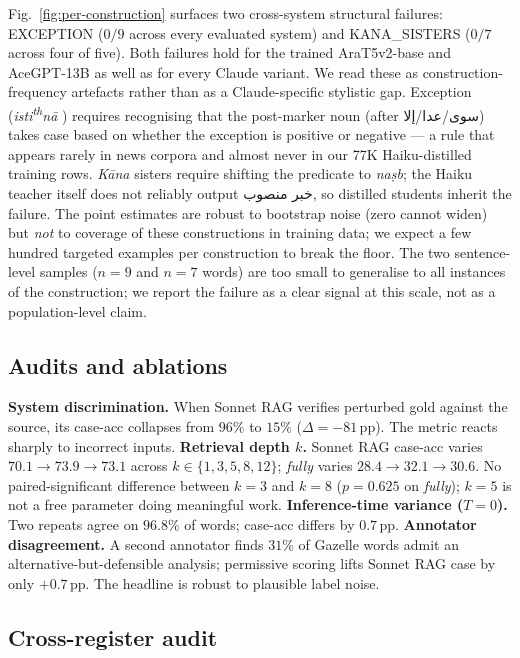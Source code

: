 \documentclass[10pt,a4paper,twocolumn]{article}
\providecommand{\textarabic}[1]{{\arabicfont #1}}
\begin{document}
Fig.~\ref{fig:per-construction} surfaces two cross-system structural failures: EXCEPTION ($0/9$ across every evaluated system) and KANA\_SISTERS ($0/7$ across four of five). Both failures hold for the trained AraT5v2-base and AceGPT-13B as well as for every Claude variant. We read these as construction-frequency artefacts rather than as a Claude-specific stylistic gap. Exception (\emph{isti\textsuperscript{th}n\=a$\,$\textsuperscript{}$\,$}) requires recognising that the post-marker noun (after \textarabic{سوى}/\textarabic{عدا}/\textarabic{إلا}) takes case based on whether the exception is positive or negative --- a rule that appears rarely in news corpora and almost never in our 77K Haiku-distilled training rows. \emph{K\=ana} sisters require shifting the predicate to \emph{na\d{s}b}; the Haiku teacher itself does not reliably output \textarabic{خبر منصوب}, so distilled students inherit the failure. The point estimates are robust to bootstrap noise (zero cannot widen) but \emph{not} to coverage of these constructions in training data; we expect a few hundred targeted examples per construction to break the floor. The two sentence-level samples ($n{=}9$ and $n{=}7$ words) are too small to generalise to all instances of the construction; we report the failure as a clear signal at this scale, not as a population-level claim.

\subsection{Audits and ablations}
\label{sec:audit}

\textbf{System discrimination.} When Sonnet RAG verifies perturbed gold against the source, its case-acc collapses from $96\%$ to $15\%$ ($\Delta = -81$\,pp). The metric reacts sharply to incorrect inputs.
\textbf{Retrieval depth $k$.} Sonnet RAG case-acc varies $70.1 \to 73.9 \to 73.1$ across $k \in \{1, 3, 5, 8, 12\}$; \emph{fully} varies $28.4 \to 32.1 \to 30.6$. No paired-significant difference between $k{=}3$ and $k{=}8$ ($p{=}0.625$ on \emph{fully}); $k{=}5$ is not a free parameter doing meaningful work.
\textbf{Inference-time variance ($T{=}0$).} Two repeats agree on $96.8\%$ of words; case-acc differs by $0.7$\,pp.
\textbf{Annotator disagreement.} A second annotator finds $31\%$ of Gazelle words admit an alternative-but-defensible analysis; permissive scoring lifts Sonnet RAG case by only $+0.7$\,pp. The headline is robust to plausible label noise.

\subsection{Cross-register audit}
\label{sec:crossreg}
\end{document}
